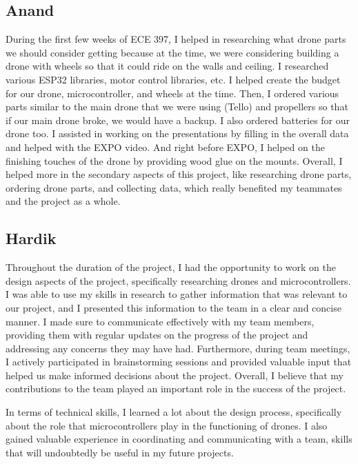 \documentclass[12pt]{article}
\begin{document}
        \subsection*{Anand}
            During the first few weeks of ECE 397, I helped in researching what drone parts we should consider getting because at the time, we were considering building a drone with wheels so that it could ride on the walls and ceiling.
            I researched various ESP32 libraries, motor control libraries, etc.
            I helped create the budget for our drone, microcontroller, and wheels at the time.
            Then, I ordered various parts similar to the main drone that we were using (Tello) and propellers so that if our main drone broke, we would have a backup.
            I also ordered batteries for our drone too.
            I assisted in working on the presentations by filling in the overall data and helped with the EXPO video.
            And right before EXPO, I helped on the finishing touches of the drone by providing wood glue on the mounts.
            Overall, I helped more in the secondary aspects of this project, like researching drone parts, ordering drone parts, and collecting data, which really benefited my teammates and the project as a whole.

        \subsection*{Hardik}
            Throughout the duration of the project, I had the opportunity to work on the design aspects of the project, specifically researching drones and microcontrollers.
            I was able to use my skills in research to gather information that was relevant to our project, and I presented this information to the team in a clear and concise manner.
            I made sure to communicate effectively with my team members, providing them with regular updates on the progress of the project and addressing any concerns they may have had.
            Furthermore, during team meetings, I actively participated in brainstorming sessions and provided valuable input that helped us make informed decisions about the project.
            Overall, I believe that my contributions to the team played an important role in the success of the project.

            In terms of technical skills, I learned a lot about the design process, specifically about the role that microcontrollers play in the functioning of drones.
            I also gained valuable experience in coordinating and communicating with a team, skills that will undoubtedly be useful in my future projects.
\end{document}
